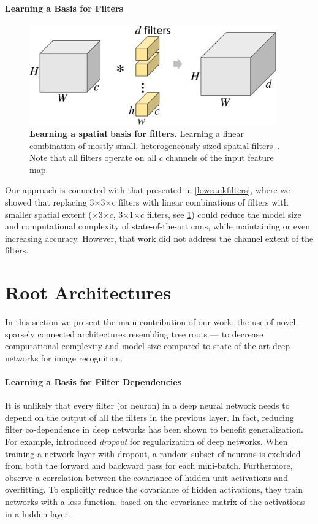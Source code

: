 \documentclass[thesis]{subfiles}
\begin{document}
	\paragraph{Learning a Basis for Filters}
	\begin{figure}[tbp]
		\centering
		\includegraphics[width=0.95\textwidth, page=3]{Figs/PDF/sparsification}
		\caption[Learning a spatial basis for filters]{\textbf{Learning a spatial basis for filters.} Learning a linear combination of mostly small, heterogeneously sized spatial filters~\citep{Ioannou2016}. Note that all filters operate on all $c$ channels of the input feature map.}
		\label{fig:spatialbasis}
	\end{figure}
	Our approach is connected with that presented in \cref{lowrankfilters}, where we showed that replacing 3$\times$3$\times$c filters with linear combinations of filters with smaller spatial extent ($\times$3$\times c$, 3$\times$1$\times c$ filters, see \cref{fig:spatialbasis}) could reduce the model size and computational complexity of state-of-the-art \glspl{cnn}, while maintaining or even increasing accuracy. However, that work did not address the channel extent of the filters.
	\section{Root Architectures}
	\label{method}
	In this section we present the main contribution of our work: the use of novel sparsely connected architectures resembling tree roots --- to decrease computational complexity and model size compared to state-of-the-art deep networks for image recognition.
	
	\paragraph{Learning a Basis for Filter Dependencies}
	It is unlikely that every filter (or neuron) in a deep neural network needs to depend on the output of all the filters in the previous layer. In fact, reducing filter co-dependence in deep networks has been shown to benefit generalization. For example, \citet{Hinton2012} introduced {\em dropout} for regularization of deep networks. When training a network layer with dropout, a random subset of neurons is excluded from both the forward and backward pass for each mini-batch.  Furthermore, \citet{Cogswell2016} observe a correlation between the covariance of hidden unit activations and overfitting. To explicitly reduce the covariance of hidden activations, they train networks with a loss function, based on the covariance matrix of the activations in a hidden layer. 
	
\end{document}
